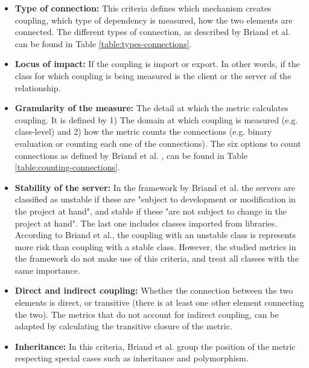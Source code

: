 \begin{itemize}
  \item \textbf{Type of connection:} This criteria defines which mechanism creates coupling, which type of dependency is measured, how the two elements are connected. The different types of connection, as described by Briand et al. \cite{briand1999unified} can be found in Table \ref{table:types-connections}.

  \item \textbf{Locus of impact:} If the coupling is import or export. In other words, if the class for which coupling is being measured is the client or the server of the relationship.

  \item \textbf{Granularity of the measure:} The detail at which the metric calculates coupling. It is defined by 1) The domain at which coupling is measured (e.g. class-level) and 2) how the metric counts the connections (e.g. binary evaluation or counting each one of the connections). The six options to count connections as defined by Briand et al. \cite{briand199unified}, can be found in Table \ref{table:counting-connections}.

  \item \textbf{Stability of the server:} In the framework by Briand et al. the servers are classified as unstable if these are  "subject to development or modification in the project at hand", and stable if these "are not subject to change in the project at hand". The last one includes classes imported from libraries. According to Briand et al., the coupling with an unstable class is represents more risk than coupling with a stable class. However, the studied metrics in the framework do not make use of this criteria, and treat all classes with the same importance.

  \item \textbf{Direct and indirect coupling:} Whether the connection between the two elements is direct, or transitive (there is at least one other element connecting the two). The metrics that do not account for indirect coupling, can be adapted by calculating the transitive closure of the metric.

  \item \textbf{Inheritance:} In this criteria, Briand et al. group the position of the metric respecting special cases such as inheritance and polymorphism.
\end{itemize}

